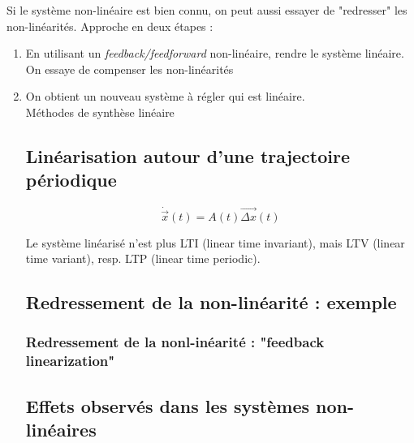\documentclass[document.tex]{subfiles}
\begin{document}
Si le système non-linéaire est bien connu, on peut aussi essayer de "redresser" les non-linéarités. Approche en deux étapes :
\begin{enumerate}
\item En utilisant un \textit{feedback/feedforward} non-linéaire, rendre le système linéaire. On essaye de compenser les non-linéarités
\item On obtient un nouveau système à régler qui est linéaire.\\
Méthodes de synthèse linéaire  


\subsection{Linéarisation autour d'une trajectoire périodique}


$$\boxed{\dot\vec{x}(t) = A(t) \vec{\Delta x} (t)}$$

Le système linéarisé n'est plus LTI (linear time invariant), mais LTV (linear time variant), resp. LTP (linear time periodic).

\subsection{Redressement de la non-linéarité : exemple}


\subsubsection{Redressement de la nonl-inéarité : "feedback linearization"}

\subsection{Effets observés dans les systèmes non-linéaires}


















\end{enumerate}
\end{document}
